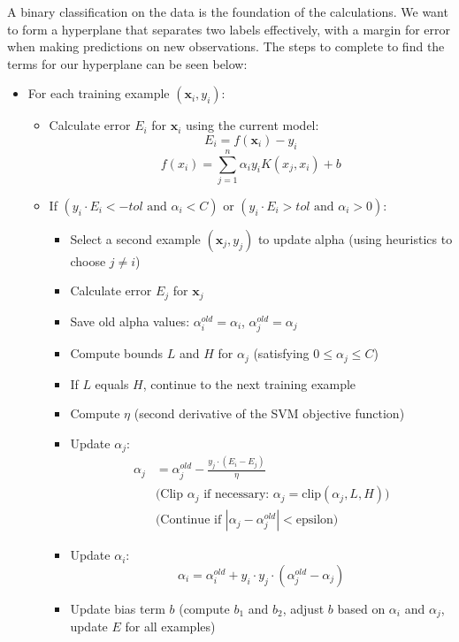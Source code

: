 \documentclass[12pt]{article}
\begin{document}
A binary classification on the data is the foundation of the calculations. We want to form a hyperplane that separates two labels effectively, with a margin for error when making predictions on new observations. The steps to complete to find the terms for our hyperplane can be seen below:

\begin{itemize}
    \item For each training example $(\mathbf{x}_i, y_i)$:
    \begin{itemize}
        \item Calculate error $E_i$ for $\mathbf{x}_i$ using the current model:
        \begin{equation*}
            E_i = f(\mathbf{x}_i) - y_i
        \end{equation*}
        \begin{equation*}
            f(x_i) = \sum_{j=1}^n \alpha_i y_i K (x_j,x_i) + b
        \end{equation*}
        \item If $(y_i \cdot E_i < -tol \text{ and } \alpha_i < C)$ or $(y_i \cdot E_i > tol \text{ and } \alpha_i > 0)$:
        \begin{itemize}
            \item Select a second example $(\mathbf{x}_j, y_j)$ to update alpha (using heuristics to choose $j \neq i$)
            \item Calculate error $E_j$ for $\mathbf{x}_j$
            \item Save old alpha values: $\alpha_i^{old} = \alpha_i$, $\alpha_j^{old} = \alpha_j$
            \item Compute bounds $L$ and $H$ for $\alpha_j$ (satisfying $0 \leq \alpha_j \leq C$)
            \item If $L$ equals $H$, continue to the next training example
            \item Compute $\eta$ (second derivative of the SVM objective function)
            \item Update $\alpha_j$:
            \begin{align*}
                \alpha_j &= \alpha_j^{old} - \frac{y_j \cdot (E_i - E_j)}{\eta} \\
                &\text{(Clip $\alpha_j$ if necessary: $\alpha_j = \text{clip}(\alpha_j, L, H)$)} \\
                &\text{(Continue if $|\alpha_j - \alpha_j^{old}| < \text{epsilon}$)}
            \end{align*}
            \item Update $\alpha_i$:
            \begin{equation*}
                \alpha_i = \alpha_i^{old} + y_i \cdot y_j \cdot (\alpha_j^{old} - \alpha_j)
            \end{equation*}
            \item Update bias term $b$ (compute $b_1$ and $b_2$, adjust $b$ based on $\alpha_i$ and $\alpha_j$, update $E$ for all examples)
        \end{itemize}
    \end{itemize}
\end{itemize}
\end{document}

